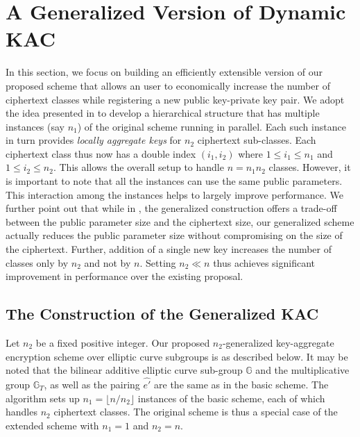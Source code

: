 \section{A Generalized Version of Dynamic KAC}
\label{sec:general}

In this section, we focus on building an efficiently extensible version of our proposed scheme that allows an user to economically increase the number of ciphertext classes while registering a new public key-private key pair. We adopt the idea presented in \cite{boneh2005collusion} to develop a hierarchical structure that has multiple instances (say $n_1$) of the original scheme running in parallel. Each such instance in turn provides \emph{locally aggregate keys} for $n_2$ ciphertext sub-classes. Each ciphertext class thus now has a double index $(i_1,i_2)$ where $1\leq i_1 \leq n_1$ and $1\leq i_2 \leq n_2$. This allows the overall setup to handle $n=n_1n_2$ classes. However, it is important to note that all the instances can use the same public parameters. This interaction among the instances helps to largely improve performance. We further point out that while in \cite{boneh2005collusion}, the generalized construction offers a trade-off between the public parameter size and the ciphertext size, our 
generalized scheme actually reduces the public parameter size without compromising on the size of the ciphertext. Further, addition of a single new key increases the number of classes only by $n_2$ and not by $n$. Setting $n_2\ll n$ thus achieves significant improvement in performance over the existing proposal.


\subsection{The Construction of the Generalized KAC}
\label{subsec:construction2}

Let $n_2$ be a fixed positive integer. Our proposed $n_2$-generalized key-aggregate encryption scheme over elliptic curve subgroups is as described below. It may be noted that the bilinear additive elliptic curve sub-group $\mathbb{G}$ and the multiplicative group $\mathbb{G}_T$, as well as the pairing $\hat{e'}$ are the same as in the basic scheme. The algorithm sets up $n_1=\lfloor n/n_2\rfloor$ instances of the basic scheme, each of which handles $n_2$ ciphertext classes. The original scheme is thus a special case of the extended scheme with $n_1=1$ and $n_2=n$.


